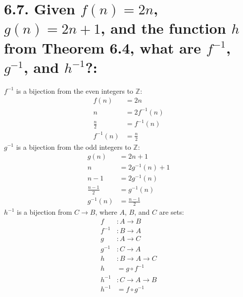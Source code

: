 \documentclass{article}
\begin{document}
\section*{6.7. Given $f(n)=2n$, $g(n)=2n+1$, and the function $h$ from Theorem 6.4, what are $f^{-1}$, $g^{-1}$, and $h^{-1}$?:}
$f^{-1}$ is a bijection from the even integers to $\mathbb{Z}$:
\begin{align*}
  f(n)&=2n\\
  n&=2f^{-1}(n)\\
  \frac{n}{2}&=f^{-1}(n)\\
  f^{-1}(n)&=\frac{n}{2}
\end{align*}
$g^{-1}$ is a bijection from the odd integers to $\mathbb{Z}$:
\begin{align*}
  g(n)&=2n+1\\
  n&=2g^{-1}(n)+1\\
  n-1&=2g^{-1}(n)\\
  \frac{n-1}{2}&=g^{-1}(n)\\
  g^{-1}(n)&=\frac{n-1}{2}
\end{align*}
$h^{-1}$ is a bijection from $C\rightarrow B$, where $A$, $B$, and $C$ are sets:
\begin{align*}
  f&:A\rightarrow B\\
  f^{-1}&:B\rightarrow A\\
  g&:A\rightarrow C\\
  g^{-1}&:C\rightarrow A\\
  h&:B\rightarrow A\rightarrow C\\
  h&=g\circ f^{-1}\\
  h^{-1}&:C\rightarrow A\rightarrow B\\
  h^{-1}&=f\circ g^{-1}
\end{align*}
\end{document}
